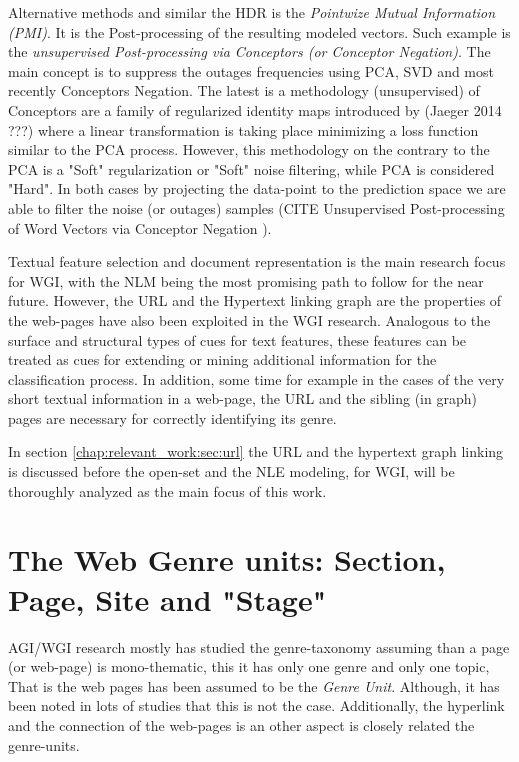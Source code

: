 Alternative methods and similar the HDR is the \textit{Pointwize Mutual Information (PMI)}. It is the Post-processing of the resulting modeled vectors. Such example is the \textit{unsupervised Post-processing via Conceptors (or Conceptor Negation)}. The main concept is to suppress the outages frequencies using PCA, SVD and most recently Conceptors Negation. The latest is a methodology (unsupervised) of Conceptors are a family of regularized identity maps introduced by (Jaeger 2014 ???) where a linear transformation is taking place minimizing a loss function similar to the PCA process. However, this methodology on the contrary to the PCA is a "Soft" regularization or "Soft" noise filtering, while PCA is considered "Hard". In both cases by projecting the data-point to the prediction space we are able to filter the noise (or outages) samples (CITE Unsupervised Post-processing of Word Vectors via Conceptor Negation ).

Textual feature selection and document representation is the main research focus for WGI, with the NLM being the most promising path to follow for the near future. However, the URL and the Hypertext linking graph are the properties of the web-pages have also been exploited in the WGI research.  Analogous to the surface and structural types of cues for text features, these features can be treated as cues for extending or mining additional information for the classification process. In addition, some time for example in the cases of the very short textual information in a web-page, the URL and the sibling (in graph) pages are necessary for correctly identifying its genre. 

In section \ref{chap:relevant_work:sec:url} the URL and the hypertext graph linking is discussed before the open-set and the NLE modeling, for WGI, will be thoroughly analyzed as the main focus of this work.

\section{The Web Genre units: Section, Page, Site and "Stage"}

AGI/WGI research mostly has studied the genre-taxonomy assuming than a page (or web-page) is mono-thematic, this it has only one genre and only one topic, That is the web pages has been assumed to be the \textit{Genre Unit}. Although, it has been noted in lots of studies that this is not the case. Additionally, the hyperlink and the connection of the web-pages is an other aspect is closely related the genre-units. 


